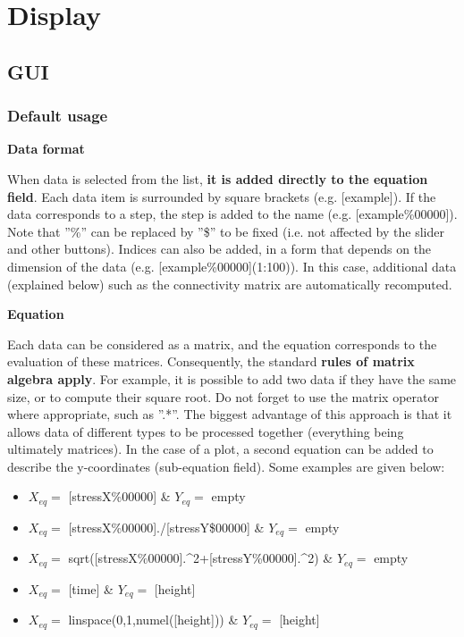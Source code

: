 \documentclass{article}
\begin{document}
\section{Display}

\subsection{GUI}

\subsubsection{Default usage}

\textbf{Data format} \newline

\par
When data is selected from the list, \textbf{it is added directly to the equation field}. Each data item is surrounded by square brackets (e.g. [example]). If the data corresponds to a step, the step is added to the name (e.g. [example\%00000]). Note that ''\%'' can be replaced by ''\$'' to be fixed (i.e. not affected by the slider and other buttons). Indices can also be added, in a form that depends on the dimension of the data (e.g. [example\%00000](1:100)). In this case, additional data (explained below) such as the connectivity matrix are automatically recomputed.
\newline

\textbf{Equation}\newline
\par
Each data can be considered as a matrix, and the equation corresponds to the evaluation of these matrices. Consequently, the standard \textbf{rules of matrix algebra apply}. For example, it is possible to add two data if they have the same size, or to compute their square root. Do not forget to use the matrix operator where appropriate, such as ''.*''. The biggest advantage of this approach is that it allows data of different types to be processed together (everything being ultimately matrices). In the case of a plot, a second equation can be added to describe the y-coordinates (sub-equation field). Some examples are given below:

\begin{itemize}
    \item $X_{eq}=$ [stressX\%00000] \& $Y_{eq}=$ empty
    \item $X_{eq}=$ [stressX\%00000]./[stressY\$00000] \& $Y_{eq}=$ empty
    \item $X_{eq}=$ sqrt([stressX\%00000].\^{}2+[stressY\%00000].\^{}2) \& $Y_{eq}=$ empty
    \item $X_{eq}=$ [time] \& $Y_{eq}=$ [height]
    \item $X_{eq}=$ linspace(0,1,numel([height])) \& $Y_{eq}=$ [height]
\end{itemize}
\end{document}
